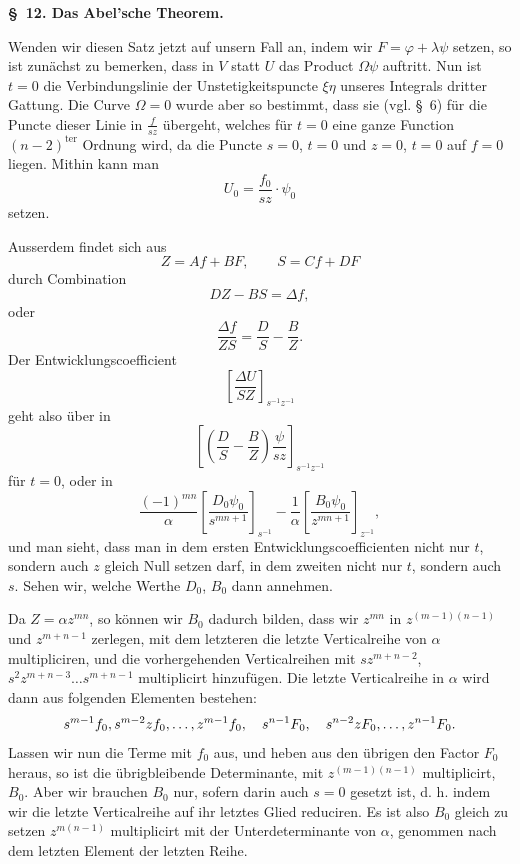 \documentclass[10pt]{article}
\begin{document}
\begin{center}
{\bfseries \S\ 12. Das Abel'sche Theorem.}
\end{center}

Wenden wir diesen Satz jetzt auf unsern Fall an, indem wir $F=\varphi+\lambda\psi$ setzen, so ist zunächst zu bemerken, dass in $V$ statt $U$ das Product $\Omega\psi$ auftritt. Nun ist $t=0$ die Verbindungslinie der Unstetigkeitspuncte $\xi\eta$ unseres Integrals dritter Gattung. Die Curve $\Omega=0$ wurde aber so bestimmt, dass sie (vgl. \S\ 6) für die Puncte dieser Linie in $\frac{f}{sz}$ übergeht, welches für $t=0$ eine ganze Function $(n-2)^{\text{ter}}$ Ordnung wird, da die Puncte $s=0$, $t=0$ und $z=0$, $t=0$ auf $f=0$ liegen. Mithin kann man
\[
U_0=\frac{f_0}{sz}\cdot\psi_0
\]
setzen.

Ausserdem findet sich aus
\[
Z=Af+BF,
\qquad
S=Cf+DF
\]
durch Combination
\[
DZ-BS=\Delta f,
\]
oder
\[
\frac{\Delta f}{ZS}=\frac{D}{S}-\frac{B}{Z}.
\]
Der Entwicklungscoefficient
\[
\left[\frac{\Delta U}{SZ}\right]_{s^{-1}z^{-1}}
\]
geht also über in
\[
\left[\left(\frac{D}{S}-\frac{B}{Z}\right)\frac{\psi}{sz}\right]_{s^{-1}z^{-1}}
\]
für $t=0$, oder in
\[
\frac{(-1)^{mn}}{\alpha}\left[\frac{D_0\psi_0}{s^{mn+1}}\right]_{s^{-1}}
-\frac{1}{\alpha}\left[\frac{B_0\psi_0}{z^{mn+1}}\right]_{z^{-1}},
\]
und man sieht, dass man in dem ersten Entwicklungscoefficienten nicht nur $t$, sondern auch $z$ gleich Null setzen darf, in dem zweiten nicht nur $t$, sondern auch $s$. Sehen wir, welche Werthe $D_0$, $B_0$ dann annehmen.

Da $Z=\alpha z^{mn}$, so können wir $B_0$ dadurch bilden, dass wir $z^{mn}$ in $z^{(m-1)(n-1)}$ und $z^{m+n-1}$ zerlegen, mit dem letzteren die letzte Verticalreihe von $\alpha$ multipliciren, und die vorhergehenden Verticalreihen mit $sz^{m+n-2}$, $s^2z^{m+n-3}\ldots s^{m+n-1}$ multiplicirt hinzufügen. Die letzte Verticalreihe in $\alpha$ wird dann aus folgenden Elementen bestehen:
\[
s^{m-1}f_0,\\ s^{m-2}zf_0,\ldots,z^{m-1}f_0,
\quad s^{n-1}F_0,
\quad s^{n-2}zF_0,\ldots,z^{n-1}F_0.
\]
Lassen wir nun die Terme mit $f_0$ aus, und heben aus den übrigen den Factor $F_0$ heraus, so ist die übrigbleibende Determinante, mit $z^{(m-1)(n-1)}$ multiplicirt, $B_0$. Aber wir brauchen $B_0$ nur, sofern darin auch $s=0$ gesetzt ist, d. h. indem wir die letzte Verticalreihe auf ihr letztes Glied reduciren. Es ist also $B_0$ gleich zu setzen $z^{m(n-1)}$ multiplicirt mit der Unterdeterminante von $\alpha$, genommen nach dem letzten Element der letzten Reihe.
\end{document}
